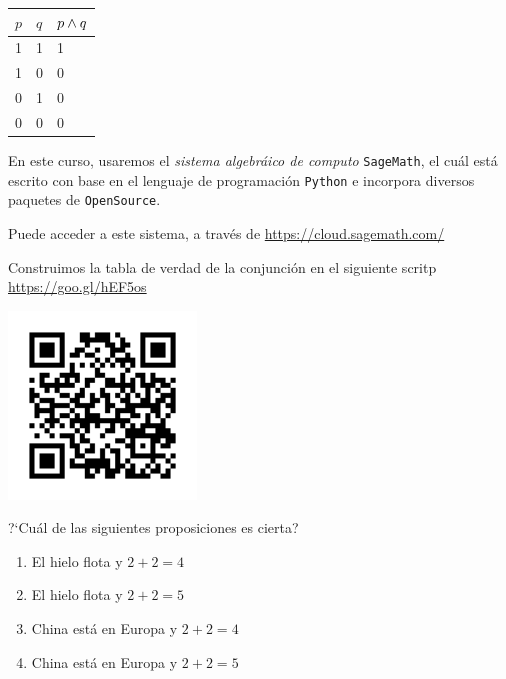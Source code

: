     \begin{tdv}[Conjunci\'on]
        \label{tdv:and}
        \begin{center}
            \begin{tabular}{|l|l|l|}\hline
                $p$ & $q$ & $p \wedge q$\\\hline
                1 & 1 & 1\\\hline
                1 & 0 & 0\\\hline
                0 & 1 & 0\\\hline
                0 & 0 & 0\\\hline
            \end{tabular}
        \end{center}
        
    \end{tdv}
    



    En este curso, usaremos el \emph{sistema algebr\'aico de computo} \texttt{SageMath}, el cu\'al est\'a escrito con base en el lenguaje de programaci\'on \texttt{Python} e incorpora diversos paquetes de \texttt{OpenSource}.
    
    
    Puede acceder a este sistema, a trav\'es de \href{https://cloud.sagemath.com/}{https://cloud.sagemath.com/} 
    



    Construimos la tabla de verdad de la conjunci\'on en el siguiente scritp \href{https://cloud.sagemath.com/projects/12787063-cafe-4f3b-a2e0-905f8b83cf3b/files/MD01_TRDV01_AND.sagews}{https://goo.gl/hEF5os}
    \begin{center}
        \includegraphics[height=5cm,keepaspectratio=true]{./md/MD01_TDV01_AND.png}
    \end{center}
    



    \begin{exmp}
        ?`Cu\'al de las siguientes proposiciones es cierta?
        
        \begin{enumerate}
            \item El hielo flota y $2+2=4$
            \item El hielo flota y $2+2=5$
            \item China est\'a en Europa y $2+2=4$
            \item China est\'a en Europa y $2+2=5$
        \end{enumerate}
        
    \end{exmp}
    


